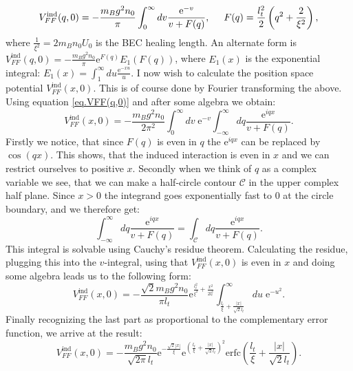 \begin{equation}
V_{FF}^\text{ind}(q,0) = -\frac{m_Bg^2n_0}{\pi}\int_{0}^\infty dv \frac{\text{e}^{-v}}{v+F(q)}, \hspace{0.5cm} F(q) = \frac{l_t^2}{2}\left(q^2+\frac{2}{\xi^2} \right),
\label{eq.VFF(q,0)}
\end{equation}
where $\frac{1}{\xi^2} = 2m_Bn_0U_0$ is the BEC healing length. An alternate form is $V_{FF}^\text{ind}(q,0) = -\frac{m_Bg^2n_0}{\pi} \text{e}^{F(q)} E_1(F(q))$, where $E_1(x)$ is the exponential integral: $E_1(x) = \int_1^\infty du \frac{\text{e}^{-xu}}{u}$. I now wish to calculate the position space potential $V_{FF}^\text{ind}(x,0)$. This is of course done by Fourier transforming the above. Using equation \eqref{eq.VFF(q,0)} and after some algebra we obtain:
\begin{equation}
V_{FF}^\text{ind}(x,0) = -\frac{m_Bg^2n_0}{2\pi^2}\int_0^\infty dv\;  \text{e}^{-v}\int_{-\infty}^\infty dq \frac{\text{e}^{iqx}}{v+F(q)}.
\end{equation}
Firstly we notice, that since $F(q)$ is even in $q$ the $\text{e}^{iqx}$ can be replaced by $\cos(qx)$. This shows, that the induced interaction is even in $x$ and we can restrict ourselves to positive $x$. Secondly when we think of $q$ as a complex variable we see, that  we can make a half-circle contour $\mathcal{C}$ in the upper complex half plane. Since $x>0$ the integrand goes exponentially fast to 0 at the circle boundary, and we therefore get:
\begin{equation}
\int_{-\infty}^\infty dq \frac{\text{e}^{iqx}}{v+F(q)} = \int_\mathcal{C} dq  \frac{\text{e}^{iqx}}{v+F(q)}. \nonumber
\end{equation}
This integral is solvable using Cauchy's residue theorem. Calculating the residue, plugging this into the $v$-integral, using that $V_{FF}^\text{ind}(x,0)$ is even in $x$ and doing some algebra leads us to the following form:
\begin{equation}
V_{FF}^\text{ind}(x,0) = -\frac{\sqrt{2}m_Bg^2n_0}{\pi l_t}\text{e}^{\frac{l_t^2}{\xi^2}+\frac{x^2}{2l_t^2}}\int_{\frac{l_t}{\xi}+\frac{|x|}{\sqrt{2}l_t}}^\infty du \; \text{e}^{-u^2}. \nonumber
\end{equation}
Finally recognizing the last part as proportional to the complementary error function, we arrive at the result:
\begin{equation}
V_{FF}^\text{ind}(x,0) = -\frac{m_Bg^2n_0}{\sqrt{2\pi} l_t} \text{e}^{-\frac{\sqrt{2}|x|}{\xi}}\text{e}^{\left(\frac{l_t}{\xi}+\frac{|x|}{\sqrt{2}l_t}\right)^2}\text{erfc}\left(\frac{l_t}{\xi}+\frac{|x|}{\sqrt{2}l_t}\right).
\end{equation}
